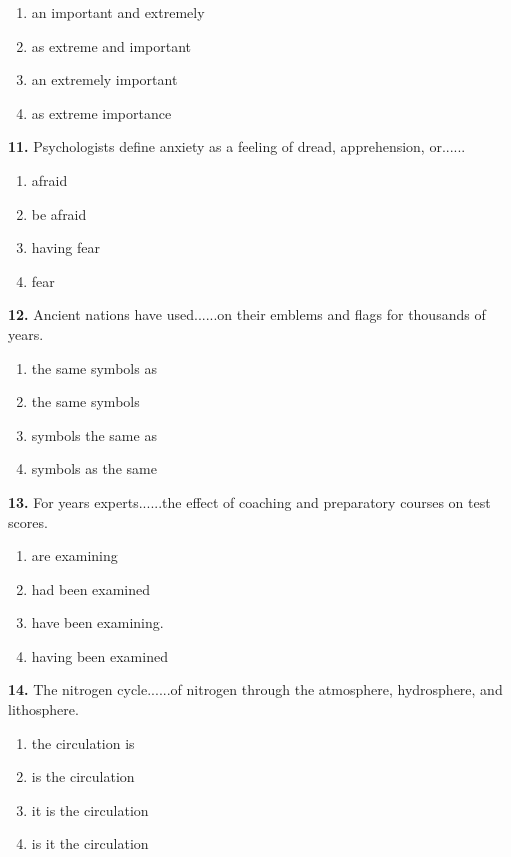 \documentclass[12pt]{article}
\begin{document}
\begin{enumerate}[label=(\Alph*),leftmargin=*,itemsep=0.2em]
\item an important and extremely
\item as extreme and important
\item an extremely important
\item as extreme importance
\end{enumerate}
\par
\vspace{0.25\baselineskip}
\noindent\textbf{11.} Psychologists define anxiety as a feeling of dread, apprehension, or......
\begin{enumerate}[label=(\Alph*),leftmargin=*,itemsep=0.2em]
\item afraid
\item be afraid
\item having fear
\item fear
\end{enumerate}
\par
\vspace{0.25\baselineskip}
\noindent\textbf{12.} Ancient nations have used......on their emblems and flags for thousands of years.
\begin{enumerate}[label=(\Alph*),leftmargin=*,itemsep=0.2em]
\item the same symbols as
\item the same symbols
\item symbols the same as
\item symbols as the same
\end{enumerate}
\par
\vspace{0.25\baselineskip}
\noindent\textbf{13.} For years experts......the effect of coaching and preparatory courses on test scores.
\begin{enumerate}[label=(\Alph*),leftmargin=*,itemsep=0.2em]
\item are examining
\item had been examined
\item have been examining.
\item having been examined
\end{enumerate}
\par
\vspace{0.25\baselineskip}
\noindent\textbf{14.} The nitrogen cycle......of nitrogen through the atmosphere, hydrosphere, and lithosphere.
\begin{enumerate}[label=(\Alph*),leftmargin=*,itemsep=0.2em]
\item the circulation is
\item is the circulation
\item it is the circulation
\item is it the circulation
\end{enumerate}
\end{document}
